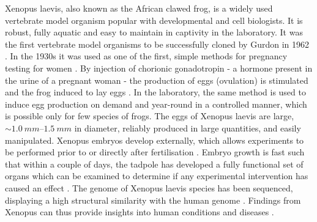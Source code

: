 \documentclass[
twoside,
openright,
titlepage,
numbers=noenddot,
headinclude,
fleqn,
a4paper,
footinclude=true,
cleardoublepage=empty,
abstractoff,
BCOR=5mm,
paper=a4,
fontsize=11pt,
british,ngerman,american,
]{scrreprt}
\begin{document}
Xenopus laevis, also known as the African clawed frog, is a widely
used vertebrate model organism popular with developmental and cell
biologists.  It is robust, fully aquatic and easy to maintain in
captivity in the laboratory.  It was the first vertebrate model
organisms to be successfully cloned by Gurdon in 1962
\cite{Gurdon1958,Gurdon1962,Gurdon1962}.  In the 1930s it was used as
one of the first, simple methods for pregnancy testing for women
\cite{Hellsten2010}.  By injection of chorionic gonadotropin - a
hormone present in the urine of a pregnant woman - the production of
eggs (ovulation) is stimulated and the frog induced to lay eggs
\cite{Hogben1930}.  In the laboratory, the same method is used to
induce egg production on demand and year-round in a controlled manner,
which is possible only for few species of frogs.  The eggs of Xenopus
laevis are large, $\sim\SIrange{1.0}{1.5}{mm}$ in diameter, reliably
produced in large quantities, and easily manipulated.  Xenopus embryos
develop externally, which allows experiments to be performed prior to
or directly after fertilisation \cite{Xenbase}.  Embryo growth is fast
such that within a couple of days, the tadpole has developed a fully
functional set of organs which can be examined to determine if any
experimental intervention has caused an effect \cite{Xenbase}.  The
genome of Xenopus laevis species has been sequenced, displaying a high
structural similarity with the human genome \cite{Hellsten2010}.
Findings from Xenopus can thus provide insights into human conditions
and diseases \cite{Xenbase,Wallingford2010}.
\end{document}
